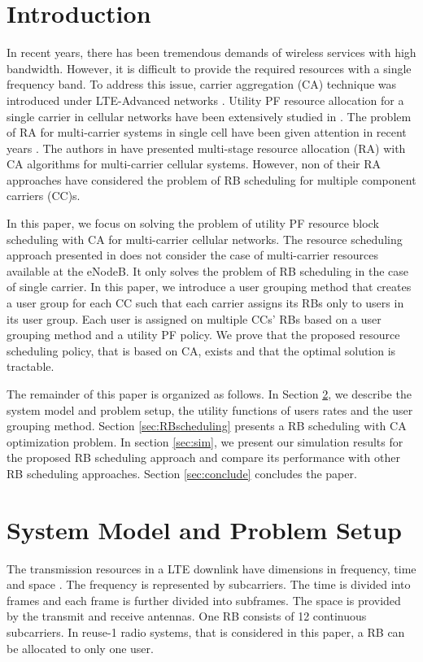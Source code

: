 \documentclass[conference]{IEEEtran}
\begin{document}
\section{Introduction}\label{sec:intro}
\vspace{-0.3em}
In recent years, there has been tremendous demands of wireless services with high bandwidth. However, it is difficult to provide the required resources with a single frequency band. To address this issue, carrier aggregation (CA) technique was introduced under LTE-Advanced networks \cite{work-item}. Utility PF resource allocation for a single carrier in cellular networks have been extensively studied in \cite{Ahmed_Utility1}. The problem of RA for multi-carrier systems in single cell have been given attention in recent years \cite{Dual-Decomposition, Resource_allocation, Rate_Balancing,Haya_Utility1}. The authors in \cite{Haya_Utility1} have presented multi-stage resource allocation (RA) with CA algorithms for multi-carrier cellular systems. However, non of their RA approaches have considered the problem of RB scheduling for multiple component carriers (CC)s.

In this paper, we focus on solving the problem of utility PF resource block scheduling with CA for multi-carrier cellular networks. The resource scheduling approach presented in \cite{SelfOrganizedLTE,Tugba-RB} does not consider the case of multi-carrier resources available at the eNodeB. It only solves the problem of RB scheduling in the case of single carrier. In this paper, we introduce a user grouping method that creates a user group for each CC such that each carrier assigns its RBs only to users in its user group. Each user is assigned on multiple CCs' RBs based on a user grouping method and a utility PF policy. We prove that the proposed resource scheduling policy, that is based on CA, exists and that the optimal solution is tractable.

The remainder of this paper is organized as follows. In Section \ref{sec:Problem_formulation}, we describe the system model and problem setup, the utility functions of users rates and the user grouping method. Section \ref{sec:RBscheduling} presents a RB scheduling with CA optimization problem. In section \ref{sec:sim}, we present our simulation results for the proposed RB scheduling approach and compare its performance with other RB scheduling approaches. Section \ref{sec:conclude} concludes the paper.
\vspace{-0.5em}
\section{System Model and Problem Setup}\label{sec:Problem_formulation}
The transmission resources in a LTE downlink have dimensions in frequency, time and space \cite{LTEBook}. The frequency is represented by subcarriers. The time is divided into frames and each frame is further divided into subframes. The space is provided by the transmit and receive antennas. One RB consists of 12 continuous subcarriers. In reuse-1 radio systems, that is considered in this paper, a RB can be allocated to only one user.
\end{document}
